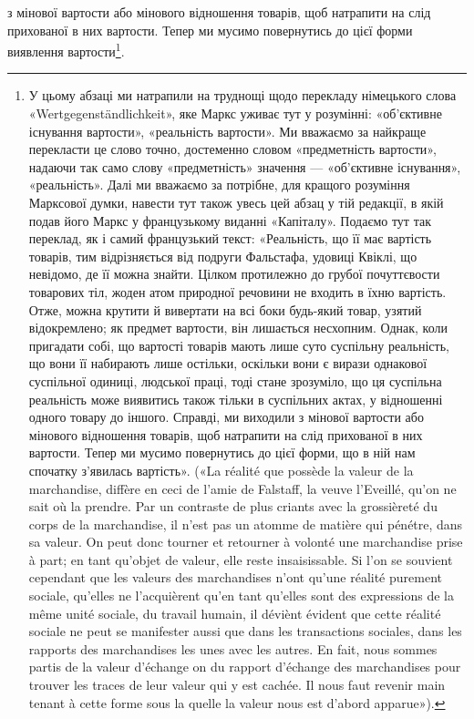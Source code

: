 \parcont{}  %
з мінової вартости або мінового відношення товарів, щоб натрапити
на слід прихованої в них вартости. Тепер ми мусимо повернутись
до цієї форми виявлення вартости\footnote*{
У цьому абзаці ми натрапили на труднощі щодо перекладу німецького
слова «\textgerman{Wertgegenständlichkeit}», яке Маркс уживає тут у розумінні:
«об’єктивне існування вартости», «реальність вартости». Ми
вважаємо за найкраще перекласти це слово точно, достеменно словом
«предметність вартости», надаючи так само слову «предметність» значення
— «об’єктивне існування», «реальність». Далі ми вважаємо за
потрібне, для кращого розуміння Марксової думки, навести тут також
увесь цей абзац у тій редакції, в якій подав його Маркс у французькому
виданні «Капіталу». Подаємо тут так переклад, як і самий французький
текст: «Реальність, що її має вартість товарів, тим відрізняється від
подруги Фальстафа, удовиці Квіклі, що невідомо, де її можна знайти.
Цілком протилежно до грубої почуттєвости товарових тіл, жоден атом
природної речовини не входить в їхню вартість. Отже, можна крутити й
вивертати на всі боки будь-який товар, узятий відокремлено; як предмет
вартости, він лишається несхопним. Однак, коли пригадати собі, що
вартості товарів мають лише суто суспільну реальність, що вони її набирають
лише остільки, оскільки вони є вирази однакової суспільної одиниці,
людської праці, тоді стане зрозуміло, що ця суспільна реальність
може виявитись також тільки в суспільних актах, у відношенні одного
товару до іншого. Справді, ми виходили з мінової вартости або мінового
відношення товарів, щоб натрапити на слід прихованої в них вартости.
Тепер ми мусимо повернутись до цієї форми, що в ній нам спочатку з’явилась
вартість». («La réalité que possède la valeur de la marchandise, diffère
en ceci de l’amie de Falstaff, la veuve l’Eveillé, qu’on ne sait où la prendre.
Par un contraste de plus criants avec la grossièreté du corps de la marchandise,
il n’est pas un atomme de matière qui pénétre, dans sa valeur. On peut
donc tourner et retourner à volonté une marchandise prise à part; en tant
qu’objet de valeur, elle reste insaisissable. Si l’on se souvient cependant
que les valeurs des marchandises n’ont qu’une réalité purement sociale,
qu’elles ne l’acquièrent qu’en tant qu’elles sont des expressions de la même
unité sociale, du travail humain, il déviènt évident que cette réalité sociale
ne peut se manifester aussi que dans les transactions sociales, dans les
rapports des marchandises les unes avec les autres. En fait, nous sommes
partis de la valeur d’échange on du rapport d’échange des marchandises
pour trouver les traces de leur valeur qui y est cachée. Il nous faut revenir
main tenant à cette forme sous la quelle la valeur nous est d’abord
apparue»). \Red
}.

